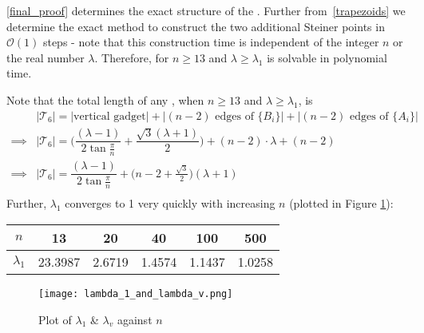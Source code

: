 \begin{remark}
    \cref{final_proof} determines the exact structure of the \smtpoly. Further from~\cref{trapezoids} we determine the exact method to construct the two additional Steiner points in $\mathcal O(1)$ steps - note that this construction time is independent of the integer $n$ or the real number $\lambda$. Therefore, \smtpoly for $n \ge 13$ and $\lambda \ge \lambda_1$ is solvable in polynomial time.
\end{remark}


Note that the total length of any \smtpoly, when $n \ge 13$ and $\lambda \ge \lambda_{1}$, is
\begin{align*}
    & |\mathcal T_6| = |\text{vertical gadget}| + |(n - 2) \text{ edges of $\{B_i\}$}| + |(n - 2) \text{ edges of $\{A_i\}$}| \\
    \implies & |\mathcal T_6| = \bigg(\dfrac{(\lambda - 1)}{2 \tan \frac \pi n} + \dfrac {\sqrt 3 (\lambda + 1)} {2}\bigg) + (n - 2) \cdot \lambda + (n - 2)\\
    \implies & {|\mathcal T_6| = \dfrac{(\lambda - 1)}{2 \tan \frac \pi n} + \bigg(n - 2 + \frac{\sqrt{3}}{2}\bigg) (\lambda + 1)}\\
\end{align*}
\noindent Further, $\lambda_1$ converges to 1 very quickly with increasing $n$ (plotted in Figure \ref{lambda_1_plot}):

    \vspace{0.3cm}
    \begin{center}
    \begin{tabular}{| c | c | c | c | c | c |}
    \hline
    $n$ & 13 & 20 & 40 & 100 & 500 \\
    \hline
    $\lambda_1$ & 23.3987 & 2.6719 & 1.4574 & 1.1437 & 1.0258\\
    \hline
    \end{tabular}
    \end{center}
    \vspace{0.3cm}

    
\begin{figure}[h]
\centering
\texttt{[image: lambda\_1\_and\_lambda\_v.png]}
\caption{Plot of $\lambda_1$ \& $\lambda_v$ against $n$}
\label{lambda_1_plot}
\end{figure}


